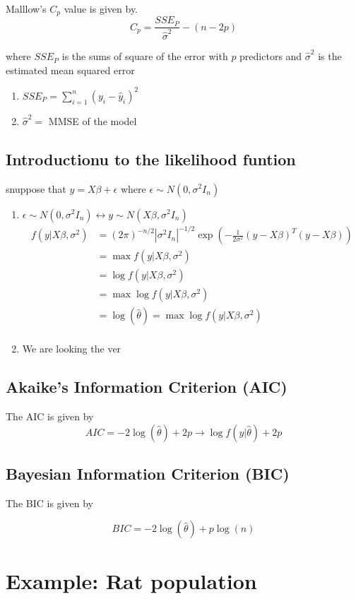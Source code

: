 \documentclass[10pt, oneside]{article}
\begin{document}
Malllow's $C_p$ value is given by.
\[
	C_p = \frac{SSE_P}{\hat{\sigma}^2} - (n - 2p)
\]

where $SSE_P$ is the sums of square of the error with $p$ predictors and
$\hat{\sigma}^2$ is the estimated mean squared error

\begin{enumerate}
	\item $SSE_P = \sum_{i=1}^n (y_i - \hat{y}_i)^2$
	\item $\hat{\sigma}^2 =$ MMSE of the model
\end{enumerate}

\subsection{Introductionu to the likelihood funtion}

snuppose that $y= X\beta + \epsilon$ where $\epsilon \sim N(0, \sigma^2I_n)$

\begin{enumerate}
	\item $\epsilon \sim N(0, \sigma^2I_n) \leftrightarrow y \sim N(X\beta, \sigma^2I_n)$
	      \[
		      \begin{split}
			      f(y|X \beta, \sigma^2) &= (2\pi)^{-n/2}|\sigma^2I_n|^{-1/2} \exp\left(-\frac{1}{2\sigma^2}(y - X\beta)^T(y - X\beta)\right) \\
			      &= \max f (y|X \beta, \sigma^2) \\
			      &= \log f(y|X \beta, \sigma^2) \\
			      &= \max \log f(y|X \beta, \sigma^2) \\
			      &= \log(\hat{\theta}) = \max \log f(y|X \beta, \sigma^2) \\
		      \end{split}
	      \]
	\item We are looking the ver
\end{enumerate}

\subsection{Akaike's Information Criterion (AIC)}

The AIC is given by
\[
	AIC = -2\log(\hat{\theta}) + 2p \rightarrow \log f(y| \hat{\theta}) + 2p
\]

\subsection{Bayesian Information Criterion (BIC)}

The BIC is given by

\[
	BIC = -2\log(\hat{\theta}) + p\log(n)
\]

\section{Example: Rat population}
\end{document}
